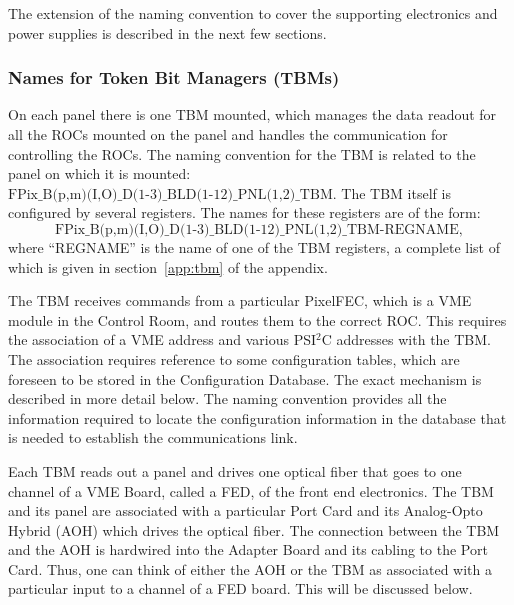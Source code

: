\documentclass{cmspaper}
\begin{document}

The extension of the naming convention 
to cover the supporting electronics and power supplies
is described in the next few sections.


\subsubsection{Names for Token Bit Managers (TBMs)}

On each panel there is one TBM mounted,
which manages the data readout for all the ROCs mounted on the panel and handles
the communication for controlling the ROCs. 
The naming convention for the TBM is related to the panel on which it is mounted:
$\mbox{FPix\_B(p,m)(I,O)\_D(1-3)\_BLD(1-12)\_PNL(1,2)\_TBM.}$
The TBM itself is configured by several registers.
The names for these registers are of the form:
\begin{displaymath}
\mbox{FPix\_B(p,m)(I,O)\_D(1-3)\_BLD(1-12)\_PNL(1,2)\_TBM-REGNAME},
\end{displaymath}
where ``REGNAME'' is the name of one of the TBM registers,
a complete list of which is given in section~\ref{app:tbm} of the appendix.

The TBM receives commands from a particular PixelFEC, 
which is a VME module in the Control Room,
and routes them to the correct ROC. 
This requires the association of a VME address and various
PSI$^{2}$C addresses with the TBM. 
The association requires reference to some configuration tables, 
which are foreseen to be stored in the Configuration Database.
The exact mechanism is described in more detail below.
 The naming convention provides all the information
required to locate the configuration information in the database
that is needed to establish the communications link.

Each TBM reads out a panel and drives one optical fiber that goes to 
one channel of a VME Board, called a FED, of the front end electronics. 
The TBM and its
panel are associated with a particular Port Card and its Analog-Opto Hybrid
(AOH) which drives the optical fiber. The connection between the TBM and the
AOH is hardwired into the Adapter Board and its cabling to the Port Card.
Thus, one can think of either the AOH or the TBM as associated with 
a particular input to a channel of a FED board. This will be discussed below.
\end{document}
